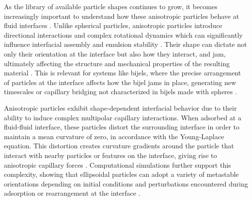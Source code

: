 As the library of available particle shapes continues to grow, it becomes increasingly important to understand how these anisotropic particles behave at fluid interfaces
\cite{wu_recent_2016, cavallaro_curvature-driven_2011}.
Unlike spherical particles, anisotropic particles introduce directional interactions and complex rotational dynamics which can significantly 
influence interfacial assembly and emulsion stability \cite{read_dimerization_2020, davies_dipolar_2015,morgan_understanding_2013}. 
Their shape can dictate not only their orientation at the interface but also how they interact, and jam, 
ultimately affecting the structure and mechanical properties of the resulting material \cite{hijnen_bijels_2015}.
This is relevant for systems like bijels, where the precise arrangement of particles at the interface affects how the bijel jams in place, generating new timescales or 
capillary bridging not characterized in bijels made with spheres \cite{gunther_timescales_2014,hijnen_bijels_2015,witt_bijel_2013}.

Anisotropic particles exhibit shape-dependent interfacial behavior due to their ability to induce complex multipolar capillary interactions. When adsorbed at a fluid-fluid interface, these 
particles distort the surrounding interface in order to maintain a mean curvature of zero, in accordance with the Young-Laplace equation. This distortion creates curvature gradients around the 
particle that interact with nearby particles or features on the interface, giving rise to anisotropic capillary forces \cite{loudet_capillary_2005, cheng_shape-anisotropic_2013}. 
Computational simulations further support this complexity, showing that ellipsoidal particles can adopt a variety of metastable orientations 
depending on initial conditions and perturbations encountered during adsorption or rearrangement at the interface \cite{gunther_lattice_2013, newton_influence_2014}. 

